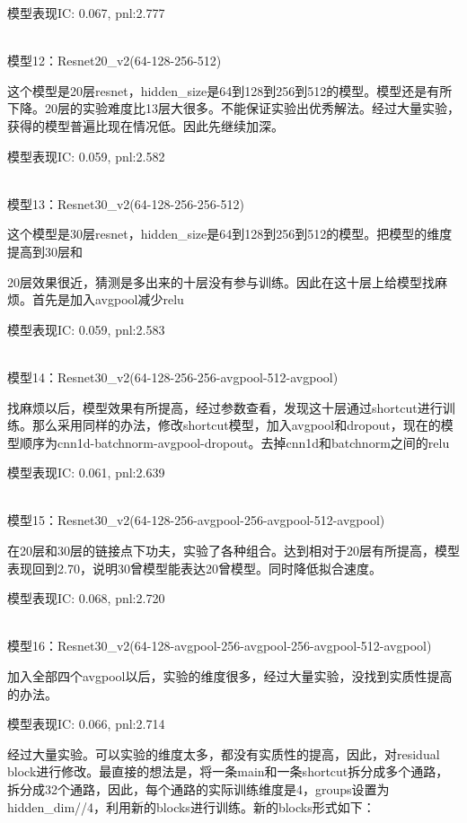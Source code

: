 \documentclass[11pt]{ctexart}
\begin{document}
模型表现{\kaishu \small IC: 0.067, pnl:2.777}

~\\
模型12：Resnet20\_v2(64-128-256-512)

这个模型是20层resnet，hidden\_size是64到128到256到512的模型。模型还是有所下降。20层的实验难度比13层大很多。不能保证实验出优秀解法。经过大量实验，获得的模型普遍比现在情况低。因此先继续加深。

模型表现{\kaishu \small IC: 0.059, pnl:2.582}

~\\
模型13：Resnet30\_v2(64-128-256-256-512)

这个模型是30层resnet，hidden\_size是64到128到256到512的模型。把模型的维度提高到30层和 \par 20层效果很近，猜测是多出来的十层没有参与训练。因此在这十层上给模型找麻烦。首先是加入avgpool减少relu

模型表现{\kaishu \small IC: 0.059, pnl:2.583}

~\\
模型14：Resnet30\_v2(64-128-256-256-avgpool-512-avgpool)

找麻烦以后，模型效果有所提高，经过参数查看，发现这十层通过shortcut进行训练。那么采用同样的办法，修改shortcut模型，加入avgpool和dropout，现在的模型顺序为cnn1d-batchnorm-avgpool-dropout。去掉cnn1d和batchnorm之间的relu

模型表现{\kaishu \small IC: 0.061, pnl:2.639}

~\\
模型15：Resnet30\_v2(64-128-256-avgpool-256-avgpool-512-avgpool)

在20层和30层的链接点下功夫，实验了各种组合。达到相对于20层有所提高，模型表现回到2.70，说明30曾模型能表达20曾模型。同时降低拟合速度。

模型表现{\kaishu \small IC: 0.068, pnl:2.720}

~\\
模型16：Resnet30\_v2(64-128-avgpool-256-avgpool-256-avgpool-512-avgpool)

加入全部四个avgpool以后，实验的维度很多，经过大量实验，没找到实质性提高的办法。

模型表现{\kaishu \small IC: 0.066, pnl:2.714}

经过大量实验。可以实验的维度太多，都没有实质性的提高，因此，对residual block进行修改。最直接的想法是，将一条main和一条shortcut拆分成多个通路，拆分成32个通路，因此，每个通路的实际训练维度是4，groups设置为hidden\_dim//4，利用新的blocks进行训练。新的blocks形式如下：
\end{document}
